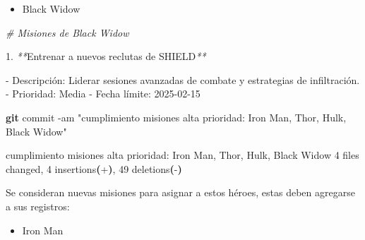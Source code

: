 \documentclass[
]{book}
\newenvironment{Shaded}{\begin{snugshade}}{\end{snugshade}}
\newcommand{\AttributeTok}[1]{\textcolor[rgb]{0.13,0.29,0.53}{#1}}
\newcommand{\CommentTok}[1]{\textcolor[rgb]{0.56,0.35,0.01}{\textit{#1}}}
\newcommand{\ErrorTok}[1]{\textcolor[rgb]{0.64,0.00,0.00}{\textbf{#1}}}
\newcommand{\ExtensionTok}[1]{#1}
\newcommand{\FunctionTok}[1]{\textcolor[rgb]{0.13,0.29,0.53}{\textbf{#1}}}
\newcommand{\KeywordTok}[1]{\textcolor[rgb]{0.13,0.29,0.53}{\textbf{#1}}}
\newcommand{\NormalTok}[1]{#1}
\newcommand{\PreprocessorTok}[1]{\textcolor[rgb]{0.56,0.35,0.01}{\textit{#1}}}
\newcommand{\StringTok}[1]{\textcolor[rgb]{0.31,0.60,0.02}{#1}}
\providecommand{\tightlist}{%
  \setlength{\itemsep}{0pt}\setlength{\parskip}{0pt}}
\begin{document}
\begin{itemize}
\tightlist
\item
  Black Widow
\end{itemize}

\begin{Shaded}
\begin{Highlighting}[]
\CommentTok{\# Misiones de Black Widow}

\ExtensionTok{1.} \PreprocessorTok{**}\NormalTok{Entrenar a nuevos reclutas de SHIELD}\PreprocessorTok{**}

   \ExtensionTok{{-}}\NormalTok{ Descripción: Liderar sesiones avanzadas de combate y estrategias de infiltración.}
   \ExtensionTok{{-}}\NormalTok{ Prioridad: Media}
   \ExtensionTok{{-}}\NormalTok{ Fecha límite: 2025{-}02{-}15}
\end{Highlighting}
\end{Shaded}

\begin{Shaded}
\begin{Highlighting}[]
\FunctionTok{git}\NormalTok{ commit }\AttributeTok{{-}am} \StringTok{"cumplimiento misiones alta prioridad: Iron Man, Thor, Hulk, Black Widow"}
\end{Highlighting}
\end{Shaded}

\begin{Shaded}
\begin{Highlighting}[]
\ExtensionTok{[main}\NormalTok{ e4c626a] cumplimiento misiones alta prioridad: Iron Man, Thor, Hulk, Black Widow}
 \ExtensionTok{4}\NormalTok{ files changed, 4 insertions}\ErrorTok{(}\ExtensionTok{+}\KeywordTok{)}\ExtensionTok{,}\NormalTok{ 49 deletions}\ErrorTok{(}\ExtensionTok{{-}}\KeywordTok{)}
\end{Highlighting}
\end{Shaded}

Se consideran nuevas misiones para asignar a estos héroes, estas deben agregarse a sus registros:

\begin{itemize}
\tightlist
\item
  Iron Man
\end{itemize}
\end{document}
